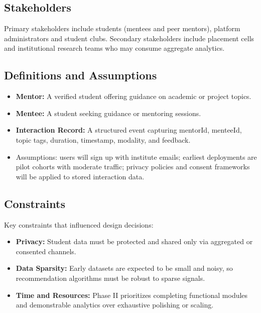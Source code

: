 \documentclass[12pt,singleside,a4paper]{article}
\begin{document}
\subsection{Stakeholders}
Primary stakeholders include students (mentees and peer mentors), platform administrators and student clubs. Secondary stakeholders include placement cells and institutional research teams who may consume aggregate analytics.

\subsection{Definitions and Assumptions}
\begin{itemize}
  \item \textbf{Mentor:} A verified student offering guidance on academic or project topics.
  \item \textbf{Mentee:} A student seeking guidance or mentoring sessions.
  \item \textbf{Interaction Record:} A structured event capturing mentorId, menteeId, topic tags, duration, timestamp, modality, and feedback.
  \item Assumptions: users will sign up with institute emails; earliest deployments are pilot cohorts with moderate traffic; privacy policies and consent frameworks will be applied to stored interaction data.
\end{itemize}

\subsection{Constraints}
Key constraints that influenced design decisions:
\begin{itemize}
  \item \textbf{Privacy:} Student data must be protected and shared only via aggregated or consented channels.
  \item \textbf{Data Sparsity:} Early datasets are expected to be small and noisy, so recommendation algorithms must be robust to sparse signals.
  \item \textbf{Time and Resources:} Phase II prioritizes completing functional modules and demonstrable analytics over exhaustive polishing or scaling.
\end{itemize}
\end{document}
